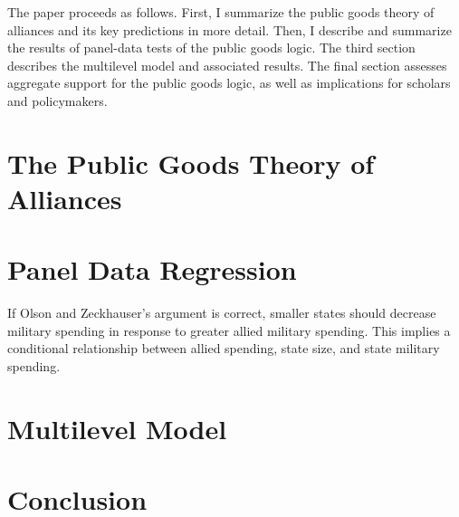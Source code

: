\documentclass[12pt]{article}
\begin{document}
The paper proceeds as follows.
First, I summarize the public goods theory of alliances and its key predictions in more detail.
Then, I describe and summarize the results of panel-data tests of the public goods logic.
The third section describes the multilevel model and associated results. 
The final section assesses aggregate support for the public goods logic, as well as implications for scholars and policymakers. 


\section{The Public Goods Theory of Alliances}


\section{Panel Data Regression}

If Olson and Zeckhauser's argument is correct, smaller states should decrease military spending in response to greater allied military spending. 
This implies a conditional relationship between allied spending, state size, and state military spending. 


\section{Multilevel Model}


\section{Conclusion}


\singlespace


%  
 
\end{document}
